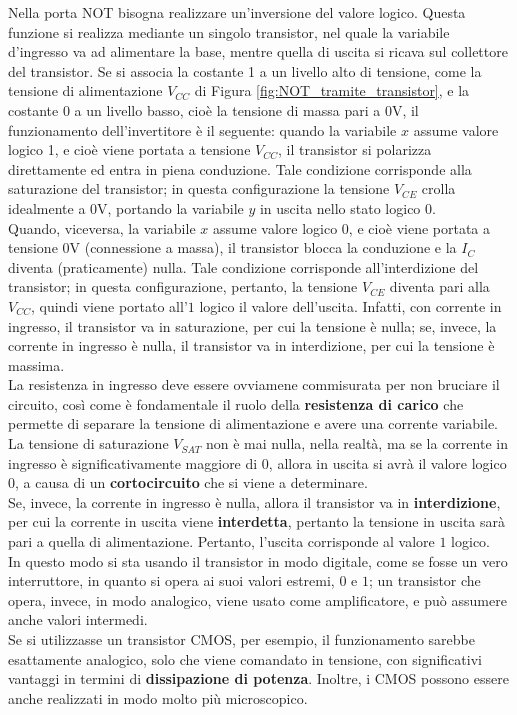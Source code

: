 \documentclass[a4paper]{extarticle}
\begin{document}
\begin{itemize}
    Nella porta NOT bisogna realizzare un’inversione del valore logico. Questa funzione si realizza mediante un singolo transistor, nel quale la variabile d’ingresso va ad alimentare la base, mentre quella di uscita si ricava sul collettore del transistor. Se si associa la costante 1 a un livello alto di tensione, come la tensione di alimentazione \(V_{CC}\) di Figura \ref{fig:NOT_tramite_transistor}, e la costante \(0\) a un livello basso, cioè la tensione di massa pari a \(0\)V, il funzionamento dell’invertitore è il seguente: quando la variabile \(x\) assume valore logico 1, e cioè viene portata a tensione \(V_{CC}\), il transistor si polarizza direttamente ed entra in piena conduzione. Tale condizione corrisponde alla saturazione del transistor; in questa configurazione la tensione \(V_{CE}\) crolla idealmente a \(0\)V, portando la variabile \(y\) in uscita nello stato logico \(0\).\\
    Quando, viceversa, la variabile \(x\) assume valore logico \(0\), e cioè viene portata a tensione \(0\)V (connessione a massa), il transistor blocca la conduzione e la \(I_{C}\) diventa (praticamente) nulla. Tale condizione corrisponde all’interdizione del transistor; in questa configurazione, pertanto, la tensione \(V_{CE}\) diventa pari alla \(V_{CC}\), quindi viene portato all'\(1\) logico il valore dell’uscita.
    Infatti, con corrente in ingresso, il transistor va in saturazione, per cui la tensione è nulla; se, invece, la corrente in ingresso è nulla, il transistor va in interdizione, per cui la tensione è massima.\\
    La resistenza in ingresso deve essere ovviamene commisurata per non bruciare il circuito, così come è fondamentale il ruolo della \textbf{resistenza di carico} che permette di separare la tensione di alimentazione e avere una corrente variabile.\\
    La tensione di saturazione \(V_{SAT}\) non è mai nulla, nella realtà, ma se la corrente in ingresso è significativamente maggiore di \(0\), allora in uscita si avrà il valore logico \(0\), a causa di un \textbf{cortocircuito} che si viene a determinare.\\
    Se, invece, la corrente in ingresso è nulla, allora il transistor va in \textbf{interdizione}, per cui la corrente in uscita viene \textbf{interdetta}, pertanto la tensione in uscita sarà pari a quella di alimentazione. Pertanto, l'uscita corrisponde al valore \(1\) logico.\\
    In questo modo si sta usando il transistor in modo digitale, come se fosse un vero interruttore, in quanto si opera ai suoi valori estremi, \(0\) e \(1\); un transistor che opera, invece, in modo analogico, viene usato come amplificatore, e può assumere anche valori intermedi.\\
    Se si utilizzasse un transistor CMOS, per esempio, il funzionamento sarebbe esattamente analogico, solo che viene comandato in tensione, con significativi vantaggi in termini di \textbf{dissipazione di potenza}. Inoltre, i CMOS possono essere anche realizzati in modo molto più microscopico.


\end{itemize}
\end{document}
